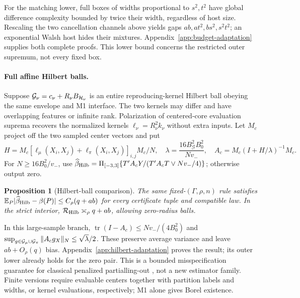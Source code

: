 \documentclass{article}
\newtheorem{proposition}[theorem]{Proposition}
\theoremstyle{definition}
\theoremstyle{remark}
\begin{document}
For the matching lower, full boxes of widths proportional to \(s^2,t^2\) have global difference complexity bounded by twice their width, regardless of host size. Rescaling the two cancellation channels above yields gaps \(ab,at^2,bs^2,s^2t^2\); an exponential Walsh host hides their mixtures. Appendix~\ref{app:budget-adaptation} supplies both complete proofs. This lower bound concerns the restricted outer supremum, not every fixed box.

\paragraph{Full affine Hilbert balls.}
Suppose \(\mathcal G_\nu=c_\nu+R_\nu B_{\mathcal H_\nu}\) is an entire reproducing-kernel Hilbert ball obeying the same envelope and M1 interface. The two kernels may differ and have overlapping features or infinite rank. Polarization of centered-core evaluation suprema recovers the normalized kernels \(\ell_\nu=R_\nu^2k_\nu\) without extra inputs. Let \(M_c\) project off the two sampled center vectors and put
\[
 H=M_c[\ell_\mu(X_i,X_j)+\ell_\pi(X_i,X_j)]_{i,j}M_c/N,\quad
 \lambda=\frac{16B_{\mathcal G}^2B_0^2}{Nv_-},\quad
 A_c=M_c(I+H/\lambda)^{-1}M_c.
\]
For \(N\ge16B_0^2/v_-\), use
\(\widehat\beta_{\rm Hilb}=\Pi_{[-3,3]}\{T'A_cY/(T'A_cT\vee Nv_-/4)\}\);
otherwise output zero.
\begin{proposition}[Hilbert-ball comparison]
\label{prop:hilbert-main}
The same fixed-\((\Gamma,\rho,n)\) rule satisfies
\(\mathbb E_P|\widehat\beta_{\rm Hilb}-\beta(P)|\le C_\rho(q+ab)\)
for every certificate tuple and compatible law. In the strict interior,
\(\mathcal R_{\rm Hilb}\asymp_\rho q+ab\), allowing zero-radius balls.
\end{proposition}
In this large-sample branch, \(\operatorname{tr}(I-A_c)\le Nv_-/(4B_0^2)\) and
\(\sup_{g\in\mathcal G_\mu\cup\mathcal G_\pi}\|A_cg_X\|_N\le\sqrt\lambda/2\).
These preserve average variance and leave \(ab+O_\rho(q)\) bias.
Appendix~\ref{app:hilbert-adaptation} proves the result; its outer lower already holds for the zero pair.
This is a bounded misspecification guarantee for classical penalized partialling-out
\citep{heckman1986spline,zhao2016partially}, not a new estimator family.
Finite versions require evaluable centers together with partition labels and widths, or kernel evaluations, respectively; M1 alone gives Borel existence.
\end{document}
